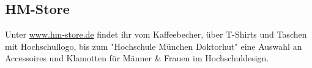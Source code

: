 \subsection{HM-Store}
Unter \url{www.hm-store.de} findet ihr vom Kaffeebecher, über T-Shirts und 
Taschen mit Hochschullogo, bis zum "Hochschule München Doktorhut" 
eine Auswahl an Accessoires und Klamotten für Männer \& Frauen im 
Hochschuldesign.